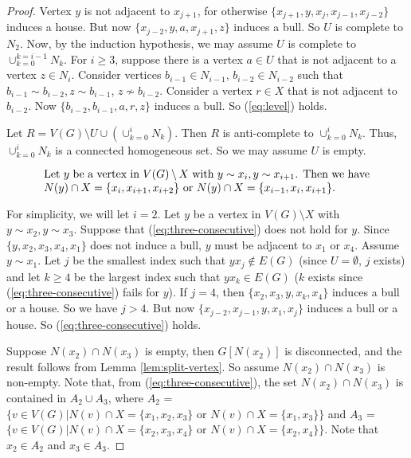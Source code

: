 \documentclass[a4paper,11pt]{article}
\theoremstyle{case}
\begin{document}
\begin{proof}
Vertex $y$ is not adjacent to $x_{j+1}$, for otherwise $\{x_{j+1}, y, x_j, x_{j-1}, x_{j-2}  \}$ induces a house. But now $\{ x_{j-2}, y, a, x_{j+1}, z \}$ induces a bull. So $U$ is complete to $N_2$. Now, by the induction hypothesis, we may assume $U$ is complete to $\cup_{k=0}^{k=i-1} N_k$. For $i \geq 3$, suppose there is a vertex $a \in U$ that is not adjacent to a vertex $z \in N_i$. Consider vertices $b_{i-1} \in N_{i-1}$, $b_{i-2} \in N_{i-2}$ such that $b_{i-1} \sim b_{i-2}, z \sim b_{i-1}$, $z \not\sim b_{i-2}$. Consider a vertex $r \in X$ that is not adjacent to $b_{i-2}$. Now $\{b_{i-2}, b_{i-1}, a, r, z \}$ induces a bull. So (\ref{eq:level}) holds. 
    
    Let $R = V(G) \setminus U \cup (\cup_{k=0}^{i} N_k)$. Then $R$ is anti-complete to  $\cup_{k=0}^{i} N_k$. Thus, $\cup_{k=0}^{i} N_k$ is a connected homogeneous set. So we may assume $U$ is empty. 

    \begin{equation}\label{eq:three-consecutive}
	\text{\parbox{.85\textwidth}{Let $y$ be a vertex in $V(G) \setminus X$ with $y \sim x_i, y \sim x_{i+1}$. Then we have $N(y)\cap X = \{x_i,x_{i+1},x_{i+2}\}$ or $N(y) \cap X = \{x_{i-1}, x_i,x_{i+1}\}$.}}
    \end{equation}
   

 For simplicity, we will let $i=2$. Let $y$ be a vertex in $V(G) \setminus X$ with $y \sim x_2, y \sim x_{3}$.  Suppose that (\ref{eq:three-consecutive}) does not hold for $y$.
 Since $\{y,x_2, x_3, x_{4}, x_1\}$ does not induce a bull, $y$ must be adjacent to $x_1$ or $x_4$. Assume $y \sim x_{1}$. Let $j$ be the smallest index such that $yx_j\notin E(G)$ (since $U = \emptyset$, $j$ exists) and let $k \geq 4 $ be the largest index such that $y x_k\in E(G)$ ($k$ exists since (\ref{eq:three-consecutive}) fails for $y$). If $j = 4$, then $\{ x_2, x_3, y, x_k, x_4 \}$ induces a bull or a house. So we have $j > 4$. But now $\{ x_{j-2}  , x_{j-1} , y, x_1, x_j\}$ induces a bull or a house. So (\ref{eq:three-consecutive}) holds. 
 

Suppose $N(x_2)\cap N(x_3)$ is empty, then $G[N(x_2)]$ is disconnected, and the result follows from Lemma \ref{lem:split-vertex}. So assume $N(x_2)\cap N(x_3)$ is non-empty. Note that, from (\ref{eq:three-consecutive}), the set $N(x_2)\cap N(x_3)$ is contained in $A_2 \cup A_3$, where $A_2$ = $\{v\in V(G)| N(v)\cap X = \{x_1, x_2, x_3\} \text{ or } N(v)\cap X = \{x_1, x_3\} \}$ and $A_3$ = $\{v\in V(G)| N(v)\cap X = \{x_2, x_3, x_4\} \text{ or } N(v)\cap X = \{x_2, x_4\}\}$. Note that $x_2\in A_2$ and $x_3\in A_3$.
    

\end{proof}
\end{document}
